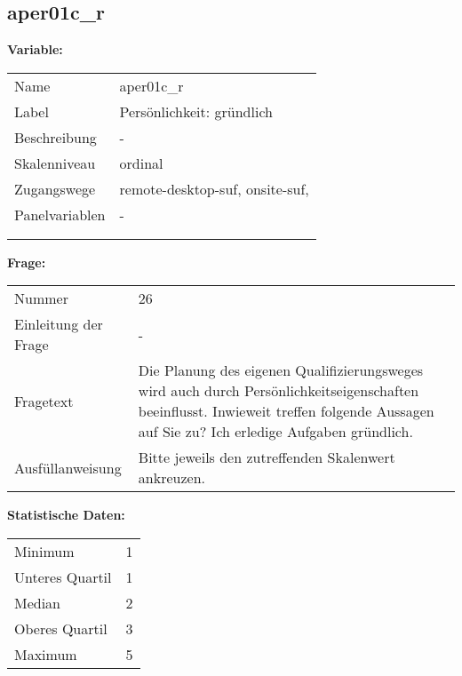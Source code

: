 	
	
	\subsection{aper01c\_r}
	\label{subSection:aper01c_r}

	\noindent\textbf{Variable:}\\
		\begin{tabular}{lL{11.3cm}}
			\label{tableVariable:aper01c_r}
			Name & aper01c\_r \\
			Label & Persönlichkeit: gründlich \\
			Beschreibung & - \\
			Skalenniveau & ordinal \\
			Zugangswege &
				remote-desktop-suf,
				onsite-suf,
 \\
			Panelvariablen & -
			 \\
			 \\
 \\
		\end{tabular}

		\vspace*{1 cm}
		\noindent\textbf{Frage:}\\
		\begin{tabular}{lL{11.3cm}}
			\label{tableQuestion:aper01c_r}
			Nummer & 26 \\
			Einleitung der Frage & - \\
			Fragetext & Die Planung des eigenen Qualifizierungsweges wird auch durch Persönlichkeitseigenschaften beeinflusst. Inwieweit treffen folgende Aussagen auf Sie zu?
Ich erledige Aufgaben gründlich. \\
			Ausfüllanweisung & Bitte jeweils den zutreffenden
Skalenwert ankreuzen. \\
		\end{tabular}


		\vspace*{1 cm}
		\noindent\textbf{Statistische Daten:}\\
			\begin{tabular}{ll}
				\label{tableStatistics:aper01c_r}
					Minimum & 1 \\
					Unteres Quartil & 1 \\
					Median & 2 \\
					Oberes Quartil & 3 \\
					Maximum & 5 \\
			\end{tabular}



